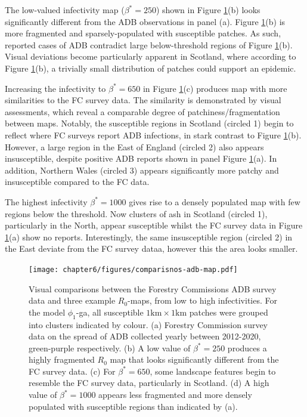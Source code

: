The low-valued infectivity map ($\beta^*=250$) shown in Figure \ref{fig:adb-comparison}(b) looks significantly different from the ADB observations in panel (a).
Figure \ref{fig:adb-comparison}(b) is more fragmented and sparsely-populated with susceptible patches.
As such, reported cases of ADB contradict large below-threshold regions of Figure \ref{fig:adb-comparison}(b).
Visual deviations become particularly apparent in Scotland, where according to Figure \ref{fig:adb-comparison}(b), a trivially small distribution of patches could support an epidemic. 

Increasing the infectivity to $\beta^*=650$ in Figure \ref{fig:adb-comparison}(c) produces map with more similarities to the FC survey data. 
The similarity is demonstrated by visual assessments, which reveal a comparable degree of patchiness/fragmentation between maps. Notably, the susceptible regions in Scotland (circled 1) begin to reflect where FC surveys report ADB infections, in stark contrast to Figure \ref{fig:adb-comparison}(b). However, a large region in the East of England (circled 2) also appears insusceptible, despite positive ADB reports shown in panel Figure \ref{fig:adb-comparison}(a). In addition, Northern Wales (circled 3) appears significantly more patchy and insusceptible compared to the FC data. 
 
The highest infectivity $\beta^*=1000$ gives rise to a densely populated map with few regions below the threshold. 
Now clusters of ash in Scotland (circled 1), particularly in the North, appear susceptible whilst the FC survey data in Figure \ref{fig:adb-comparison}(a) show no reports.
Interestingly, the same insusceptible region (circled 2) in the East deviate from the FC survey dataa, however this the area looks smaller. 

\begin{landscape}
\begin{figure}
    \centering
    \texttt{[image: chapter6/figures/comparisnos-adb-map.pdf]}
    \caption{Visual comparisons between the Forestry Commissions ADB survey data and three example $R_0$-maps, from low to high infectivities.
    For the model $\phi_1$-ga, all susceptible $1\mathrm{km \times 1 km}$ patches were grouped into clusters indicated by colour.
    (a) Forestry Commission survey data on the spread of ADB collected yearly between 2012-2020, green-purple respectively.
    (b) A low value of $\beta^*=250$ produces a highly fragmented $R_0$ map that looks significantly different from the FC survey data.
    (c) For $\beta^*=650$, some landscape features begin to resemble the FC survey data, particularly in Scotland. 
    (d) A high value of $\beta^*=1000$ appears less fragmented and more densely populated with susceptible regions than indicated by (a).}
    \label{fig:adb-comparison}
\end{figure}
\end{landscape}

